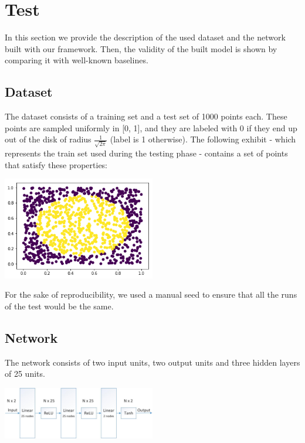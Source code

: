 \documentclass[10pt,conference,compsocconf]{IEEEtran}
\begin{document}
\section{Test}
 

In this section we provide the description of the used dataset and the network built with our framework. Then, the validity of the built model is shown by comparing it with well-known baselines.

\subsection{Dataset}
The dataset consists of a training set and a test set of 1000 points each. These points are sampled uniformly in [0, 1], and they are labeled with 0 if they end up out of the disk of radius \( \frac{1}{\sqrt{2\pi}} \) (label is 1 otherwise). The following exhibit - which represents the train set used during the testing phase - contains a set of points that satisfy these properties:

\begin{center}
	\captionsetup{type=figure}
	\includegraphics[width=0.5\textwidth]{img/dataset.png}
	\label{fig:dataset}
\end{center} 

For the sake of reproducibility, we used a manual seed to ensure that all the runs of the test would be the same.

\subsection{Network}
The network consists of two input units, two output units and three hidden layers of 25 units.

\begin{center}
	\captionsetup{type=figure}
	\includegraphics[width=0.5\textwidth]{img/Network.jpg}
	\label{fig:network}
\end{center} 
\end{document}
